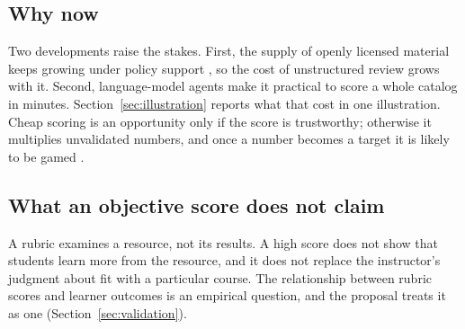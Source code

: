 \subsection{Why now}
Two developments raise the stakes. First, the supply of openly licensed material keeps growing under policy support \cite{unesco2019}, so the cost of unstructured review grows with it. Second, language-model agents make it practical to score a whole catalog in minutes. Section~\ref{sec:illustration} reports what that cost in one illustration. Cheap scoring is an opportunity only if the score is trustworthy; otherwise it multiplies unvalidated numbers, and once a number becomes a target it is likely to be gamed \cite{campbell1979,strathern1997}.

\subsection{What an objective score does not claim}
A rubric examines a resource, not its results. A high score does not show that students learn more from the resource, and it does not replace the instructor's judgment about fit with a particular course. The relationship between rubric scores and learner outcomes is an empirical question, and the proposal treats it as one (Section~\ref{sec:validation}).
